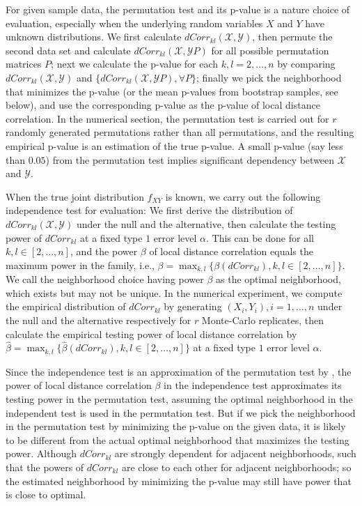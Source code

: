 \documentclass[11pt]{article}
\begin{document}
For given sample data, the permutation test and its p-value is a nature choice of evaluation, especially when the underlying random variables $X$ and $Y$ have unknown distributions. We first calculate $dCorr_{kl}(\mathcal{X},\mathcal{Y})$, then permute the second data set and calculate $dCorr_{kl}(\mathcal{X},\mathcal{Y}P)$ for all possible permutation matrices $P$; next we calculate the p-value for each $k,l=2,\ldots,n$ by comparing $dCorr_{kl}(\mathcal{X},\mathcal{Y})$ and $\{dCorr_{kl}(\mathcal{X},\mathcal{Y}P), \forall P\}$; finally we pick the neighborhood that minimizes the p-value (or the mean p-values from bootstrap samples, see below), and use the corresponding p-value as the p-value of local distance correlation. In the numerical section, the permutation test is carried out for $r$ randomly generated permutations rather than all permutations, and the resulting empirical p-value is an estimation of the true p-value. A small p-value (say less than $0.05$) from the permutation test implies significant dependency between $\mathcal{X}$ and $\mathcal{Y}$.

When the true joint distribution $f_{XY}$ is known, we carry out the following independence test for evaluation: We first derive the distribution of $dCorr_{kl}(\mathcal{X}, \mathcal{Y})$ under the null and the alternative, then calculate the testing power of $dCorr_{kl}$ at a fixed type $1$ error level $\alpha$. This can be done for all $k,l\in [2,\ldots,n]$, and the power $\beta$ of local distance correlation equals the maximum power in the family, i.e., $\beta=\max_{k,l}\{\beta(dCorr_{kl}), k,l\in [2,\ldots,n]\}$. We call the neighborhood choice having power $\beta$ as the optimal neighborhood, which exists but may not be unique. In the numerical experiment, we compute the empirical distribution of $dCorr_{kl}$ by generating $(X_{i},Y_{i}), i=1,\ldots,n$ under the null and the alternative respectively for $r$ Monte-Carlo replicates, then calculate the empirical testing power of local distance correlation by $\hat{\beta}=\max_{k,l}\{\hat{\beta}(dCorr_{kl}), k,l\in [2,\ldots,n]\}$ at a fixed type $1$ error level $\alpha$. 

Since the independence test is an approximation of the permutation test by \cite{LehnmanRomanoStatBook}, the power of local distance correlation $\beta$ in the independence test approximates its testing power in the permutation test, assuming the optimal neighborhood in the independent test is used in the permutation test. But if we pick the neighborhood in the permutation test by minimizing the p-value on the given data, it is likely to be different from the actual optimal neighborhood that maximizes the testing power. Although $dCorr_{kl}$ are strongly dependent for adjacent neighborhoods, such that the powers of $dCorr_{kl}$ are close to each other for adjacent neighborhoods; so the estimated neighborhood by minimizing the p-value may still have power that is close to optimal. 
\end{document}
